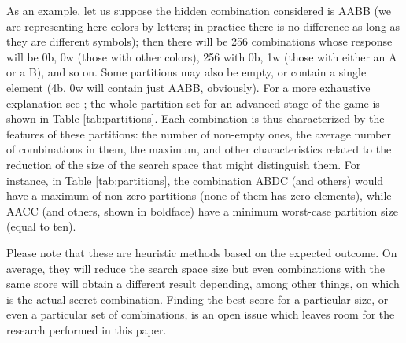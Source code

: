 \documentclass[conference]{IEEEtran}
\begin{document}
As an example, let us suppose
the hidden combination considered is AABB (we are representing here
colors by letters; in practice there is no difference as long as they
are different symbols); then there will be 256 combinations whose
response will be 0b, 0w (those with other colors), 256 with 0b, 1w
(those with either an A or a B), and so on. Some partitions may also
be empty, or contain a single element (4b, 0w will contain just AABB,
obviously).  For a more exhaustive explanation see \cite{Kooi200513};
the whole partition set for an  
advanced stage of the game is shown in Table \ref{tab:partitions}. Each combination is thus characterized by the features of these partitions: the number of non-empty ones, the average number of combinations in them, the
maximum, and other characteristics related to the reduction of the size of the search space that might distinguish them. 
For instance, in Table \ref{tab:partitions}, the combination ABDC (and others) would have a maximum of non-zero partitions (none of them has zero elements), while AACC (and others, shown in boldface) have a minimum worst-case
partition size (equal to ten).

Please note that these are heuristic methods based on the expected
outcome. On average, they will reduce the search space size
but even combinations with the same score will obtain a different
result depending, among other things, on which is the actual secret combination. Finding the best score for a particular size, 
or even a particular set of combinations,
is an open issue which leaves room for the research performed in this paper. 
\end{document}
